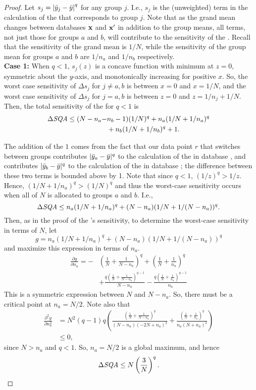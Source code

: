 \begin{proof}
Let $s_{j} =  \left\vert \bar{y}_{j} - \bar{y} \right\vert ^q$ for any group $j$. I.e., $s_{j}$ is the (unweighted) term in the calculation of the \sqa that corresponds to group $j$. Note that as the grand mean changes between databases $\mathbf{x}$ and $\mathbf{x'}$ in addition to the group means, all terms, not just those for groups $a$ and $b$, will contribute to the sensitivity of the \sqa. Recall that the sensitivity of the grand mean is $1/N$, while the sensitivity of the group mean for groups $a$ and $b$ are $1/n_a$ and $1/n_b$ respectively. \\

\noindent\textbf{Case 1:} When $q<1$, $s_j(z)$ is a concave function with minimum at $z=0$, symmetric about the $y$-axis, and monotonically increasing for positive $x$. So, the worst case sensitivity of $\Delta s_j$ for $j \ne a,b$ is between $x=0$ and $x=1/N$, and the worst case sensitivity of $\Delta s_j$ for $j = a,b$ is between $z=0$ and $z=1/n_j + 1/N$. Then, the total sensitivity of the \sqa for $q<1$ is
%
\begin{align*}
 \Delta\textit{SQA} \le  (N-n_a-&n_b-1)(1/N)^q + n_a(1/N + 1/n_a)^q \\
 &+ n_b(1/N + 1/n_b)^q + 1 .
\end{align*}

The addition of the $1$ comes from the fact that our data point $r$ that switches between groups contributes $\vert \bar{y}_a - \bar{y} \vert^q$ to the calculation of the \sqa in database \x, and contributes $\vert \bar{y}_b - \bar{y} \vert^q$ to the calculation of the \sqa in database \xprime; the difference between these two terms is bounded above by 1. Note that since $q<1$, $(1/z)^q > 1/z$. Hence, $(1/N + 1/n_a)^q > (1/N)^q$ and thus the worst-case sensitivity occurs when all of $N$ is allocated to groups $a$ and $b$. I.e.,
%
$$ \Delta\textit{SQA} \le n_a(1/N + 1/n_a)^q + (N-n_a)(1/N + 1/(N-n_a))^q. $$
Then, as in the proof of the \sqe's sensitivity, to determine the worst-case sensitivity in terms of $N$, let 
$$g = n_a(1/N + 1/n_a)^q + (N-n_a)(1/N + 1/(N-n_a))^q $$
and maximize this expression in terms of $n_a$.
\begin{align*}
\frac{\partial g}{\partial n_a} = -&\left(\frac{1}{N} + \frac{1}{N-n_a}\right)^q + \left(\frac{1}{N} + \frac{1}{n_a}\right)^q \\
&+ \frac{q\left(\frac{1}{N} + \frac{1}{N-n_a}\right)^{q-1}}{N-n_a} - \frac{q\left(\frac{1}{N} + \frac{1}{n_a}\right)^{q-1}}{n_a}
\end{align*}
This is a symmetric expression between $N$ and $N-n_a$. So, there must be a critical point at $n_a = N/2$. Note also that
\begin{align*}
\frac{\partial^2 g}{\partial n_a^2} &= N^2(q-1)q \left( \frac{(\frac{1}{N} + \frac{1}{N-n_a})^q}{(N-n_a)(-2N+n_a)^2} + \frac{\left(\frac{1}{N} + \frac{1}{n_a}\right)^q}{n_a(N+n_a)^2}\right) \\
	&\le 0,
\end{align*}
since $N>n_a$ and $q<1$. So, $n_a = N/2$ is a global maximum, and hence
%
$$\Delta\textit{SQA} \le N \left( \frac{3}{N} \right)^q.$$


\end{proof}
